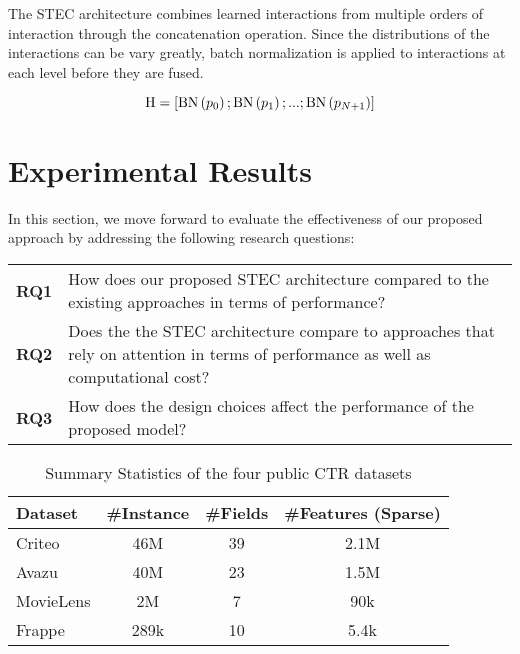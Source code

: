 \documentclass{article}
\begin{document}
The STEC architecture combines learned interactions from multiple orders of interaction through the concatenation operation. Since the distributions of the interactions can be vary greatly, batch normalization is applied to interactions at each level before they are fused.

\begin{equation}
    \textup{H} = \left [\textup{BN}\left ( p_0 \right );\textup{BN}\left ( p_1 \right );...;\textup{BN}\left ( p_{N+1} \right ) \right ]
\end{equation}

\section{Experimental Results}

In this section, we move forward to evaluate the effectiveness of our proposed approach by addressing the following research questions:

\begin{table}[h]
\centering
\begin{tabularx}{\columnwidth}{lX}
    \textbf{RQ1} & How does our proposed STEC architecture compared to the existing approaches in terms of performance?                                                  \\
    \textbf{RQ2} & Does the the STEC architecture compare to approaches that rely on attention in terms of performance as well as computational cost? \\
    \textbf{RQ3} & How does the design choices affect the performance of the proposed model? \\
\end{tabularx}
\end{table}


\begin{table}[h]
\centering
\caption{Summary Statistics of the four public CTR datasets}
\label{table:datasets}
\begin{tabular}{@{}l|c|c|c@{}}
\toprule
Dataset      & \#Instance & \#Fields & \#Features (Sparse) \\ \midrule
Criteo       &  46M         & 39        & 2.1M                   \\
Avazu        & 40M         & 23        & 1.5M                   \\
MovieLens    & 2M          & 7        & 90k                   \\
Frappe       & 289k          & 10        & 5.4k                   \\ \bottomrule
\end{tabular}
\end{table}
\end{document}
